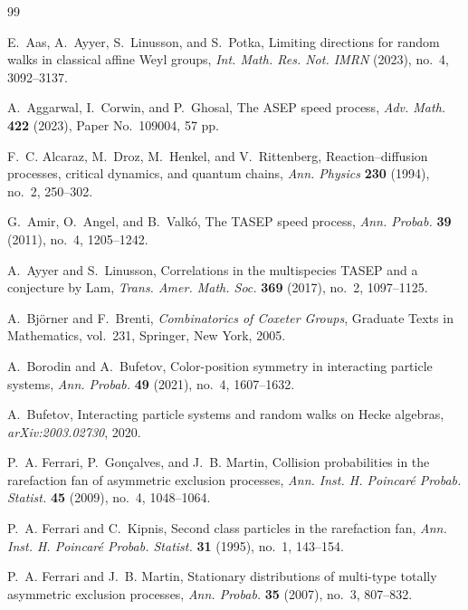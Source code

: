 \documentclass[11pt,a4paper]{amsart}
\theoremstyle{definition}
\theoremstyle{remark}
\numberwithin{equation}{section}
\begin{document}
	\begin{thebibliography}{99}
		
		E.~Aas, A.~Ayyer, S.~Linusson, and S.~Potka,
		Limiting directions for random walks in classical affine Weyl groups,
		\emph{Int. Math. Res. Not. IMRN} (2023), no.~4, 3092--3137.
		
		A.~Aggarwal, I.~Corwin, and P.~Ghosal,
		The ASEP speed process,
		\emph{Adv. Math.} \textbf{422} (2023), Paper No.~109004, 57 pp.
		
		F.~C. Alcaraz, M.~Droz, M.~Henkel, and V.~Rittenberg,
		Reaction--diffusion processes, critical dynamics, and quantum chains,
		\emph{Ann. Physics} \textbf{230} (1994), no.~2, 250--302.
		
		G.~Amir, O.~Angel, and B.~Valk\'o,
		The TASEP speed process,
		\emph{Ann. Probab.} \textbf{39} (2011), no.~4, 1205--1242.
		
		A.~Ayyer and S.~Linusson,
		Correlations in the multispecies TASEP and a conjecture by Lam,
		\emph{Trans. Amer. Math. Soc.} \textbf{369} (2017), no.~2, 1097--1125.
		
		
		A.~Bj\"orner and F.~Brenti,
		\emph{Combinatorics of Coxeter Groups},
		Graduate Texts in Mathematics, vol.~231, Springer, New York, 2005.
		
		A.~Borodin and A.~Bufetov,
		Color-position symmetry in interacting particle systems,
		\emph{Ann. Probab.} \textbf{49} (2021), no.~4, 1607--1632.
		
		A.~Bufetov,
		Interacting particle systems and random walks on Hecke algebras,
		\emph{arXiv:2003.02730}, 2020.
		
		P.~A. Ferrari, P.~Gon\c{c}alves, and J.~B. Martin,
		Collision probabilities in the rarefaction fan of asymmetric exclusion processes,
		\emph{Ann. Inst. H. Poincar\'e Probab. Statist.}
		\textbf{45} (2009), no.~4, 1048--1064.
		
		P.~A. Ferrari and C.~Kipnis,
		Second class particles in the rarefaction fan,
		\emph{Ann. Inst. H. Poincar\'e Probab. Statist.} \textbf{31} (1995),
		no.~1, 143--154.
		
		P.~A. Ferrari and J.~B. Martin,
		Stationary distributions of multi-type totally asymmetric exclusion processes,
		\emph{Ann. Probab.} \textbf{35} (2007), no.~3, 807--832.
		

\end{thebibliography}
\end{document}
